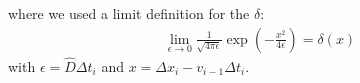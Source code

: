\documentclass[../template.tex]{subfiles}
\begin{document}
where we used a limit definition for the $\delta$:
\begin{align*}
    \lim_{\epsilon \to 0} \frac{1}{\sqrt{4 \pi \epsilon}} \exp\left(-\frac{x^2}{4 \epsilon} \right) = \delta(x)
\end{align*}
with $\epsilon = \hat{D} \Delta t_i$ and $x = \Delta x_i - v_{i-1} \Delta t_i$.

\begin{comment}
In the limit $\hat{D} \to 0$:
\begin{align*}
    \prod_i \dd{\Delta x_i} \delta\left(\frac{\Delta x_i}{\Delta t_i} - v_i \right) \to \prod_\tau \dd{x}(\tau) \delta(\dot{x}(\tau) - v(\tau))
 \end{align*} 
 leading to:
 \begin{align*}
     \prod_i \frac{\dd{\Delta x_i}}{\sqrt{4 \pi \hat{D} \Delta t_i}} \exp\left(-\frac{1}{4 \hat{D}}\left[\frac{\Delta x_i}{\Delta t_i} - v_i\right] \right)^2
 \end{align*}
 and
 \begin{align*}
     \dd{x} = v\dd{\tau} + \sqrt{2 \hat{D}} \dd{\hat{B}} \Rightarrow \frac{(\dd{\hat{B}})^2}{\dd{\tau}} = \frac{(\dd{x} - v \dd{\tau})^2}{\sqrt{2 \hat{D}} \dd{\tau}}  
 \end{align*}
\end{comment}
\end{document}
